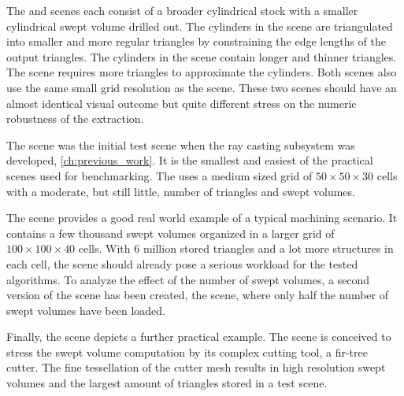 The \cylinders and \cylindersd scenes each consist of a broader cylindrical stock with a smaller cylindrical swept volume drilled out.
The cylinders in the \cylindersd scene are triangulated into smaller and more regular triangles by constraining the edge lengths of the output triangles.
The cylinders in the \cylinders scene contain longer and thinner triangles.
The \cylindersd scene requires more triangles to approximate the cylinders.
Both scenes also use the same small grid resolution as the \cubes scene.
These two scenes should have an almost identical visual outcome but quite different stress on the numeric robustness of the extraction.

The \cylinderhead scene was the initial test scene when the ray casting subsystem was developed, \cf \cref{ch:previous_work}.
It is the smallest and easiest of the practical scenes used for benchmarking.
The \cylinderhead uses a medium sized grid of $50\times50\times30$ cells with a moderate, but still little, number of triangles and swept volumes.

The \impeller scene provides a good real world example of a typical machining scenario.
It contains a few thousand swept volumes organized in a larger grid of $100\times100\times40$ cells.
With 6 million stored triangles and a lot more structures in each cell, the \impeller scene should already pose a serious workload for the tested algorithms.
To analyze the effect of the number of swept volumes, a second version of the \impeller scene has been created, the \impellerhalf scene, where only half the number of swept volumes have been loaded.

Finally, the \turbine scene depicts a further practical example.
The scene is conceived to stress the swept volume computation by its complex cutting tool, a fir-tree cutter.
The fine tessellation of the cutter mesh results in high resolution swept volumes and the largest amount of triangles stored in a test scene.

